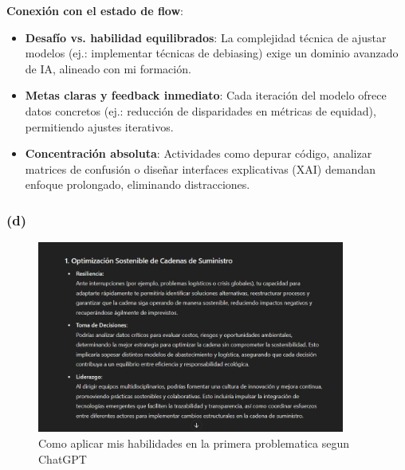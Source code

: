 \documentclass[12pt]{article}
\begin{document}
\textbf{Conexión con el estado de flow}:
\begin{itemize}
    \item \textbf{Desafío vs. habilidad equilibrados}: La complejidad técnica de ajustar modelos (ej.: implementar técnicas de debiasing) exige un dominio avanzado de IA, alineado con mi formación.
    \item \textbf{Metas claras y feedback inmediato}: Cada iteración del modelo ofrece datos concretos (ej.: reducción de disparidades en métricas de equidad), permitiendo ajustes iterativos.
    \item \textbf{Concentración absoluta}: Actividades como depurar código, analizar matrices de confusión o diseñar interfaces explicativas (XAI) demandan enfoque prolongado, eliminando distracciones. 
\end{itemize}

\subsubsection*{(d)}

\begin{figure}[h]
    \centering
    \includegraphics[width=0.9\textwidth]{img/problematica_1.png}
    \caption{Como aplicar mis habilidades en la primera problematica segun ChatGPT}
\end{figure}
\end{document}
